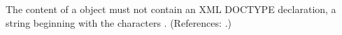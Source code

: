 The content of a \Notes object must not contain an XML
DOCTYPE declaration, \ie a string beginning with the characters
.  (References: .)
